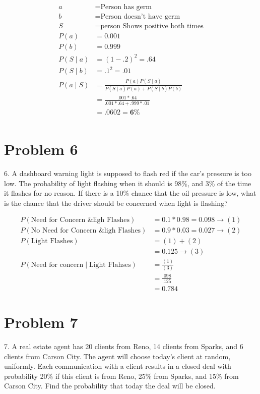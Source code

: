\documentclass{article}
\begin{document}
		\begin{align*}
	a &= \text{Person has germ} \\
	b &= \text{Person doesn't have germ} \\
	S &= \text{person Shows positive both times}\\
	P(a) &= 0.001 \\
	P(b) &= 0.999\\
	P(S \mid a ) &= (1-.2)^2 = .64\\
	P(S \mid b) &= .1^2 = .01\\
	P(a \mid S) & = \frac{P(a) P(S \mid a)}{P(S \mid a) P(a) + P(S \mid b) P(b)}\\
	&= \frac{.001 * .64}{.001 * .64 + .999 * .01 }\\
	&= .0602 = \boldsymbol{6\%} \\
	\end{align*}
	
	\section*{Problem 6} 
6. A dashboard warning light is supposed to flash red if the car's pressure is too low. The probability of light flashing when it should is 98\%, and 3\% of the time it flashes for no reason. If there is a 10\% chance that the oil pressure is low, what is the chance that the driver should be concerned when light is flashing?

\begin{align*}
P(\text{Need for Concern \& ligh Flashes}) &= 0.1 * 0.98 = 0.098  \rightarrow (1) \\
P(\text{No Need for Concern \& ligh Flashes}) &= 0.9 * 0.03 = 0.027 \rightarrow (2) \\
P(\text{Light Flashes}) &= (1) + (2) \\
&= 0.125 \rightarrow (3) \\
P(\text{Need for concern} \mid \text{Light Flahses}) &= \frac{(1)}{(3)}\\
&= \frac{.098}{.125}\\
&= \boldsymbol{0.784}
\end{align*}


	\section*{Problem 7} 
	7. A real estate agent has 20 clients from Reno, 14 clients from Sparks, and 6 clients from Carson City. The agent will choose today's client at random, uniformly. Each communication with a client results in a closed deal with probability 20\% if this client is from Reno, 25\% from Sparks, and 15\% from Carson City. Find the probability that today the deal will be closed. 
	
\end{document}

